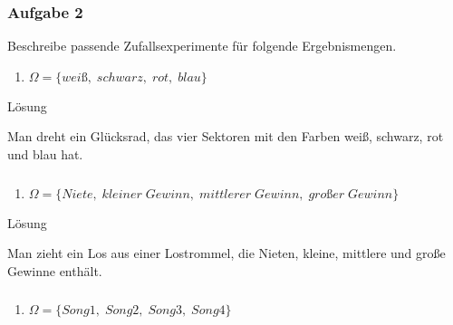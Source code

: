 \documentclass[
  ngerman,
]{book}
\providecommand{\tightlist}{%
  \setlength{\itemsep}{0pt}\setlength{\parskip}{0pt}}
\begin{document}
\hypertarget{section-45}{%
\subsubsection*{}\label{section-45}}

\hypertarget{aufgabe-2-6}{%
\subsubsection*{Aufgabe 2}\label{aufgabe-2-6}}

Beschreibe passende Zufallsexperimente für folgende Ergebnismengen.

\begin{enumerate}
\def\labelenumi{\alph{enumi})}
\tightlist
\item
  \(\Omega = \{weiß,\; schwarz,\; rot,\; blau \}\)
\end{enumerate}

Lösung

Man dreht ein Glücksrad, das vier Sektoren mit den Farben weiß, schwarz, rot und blau hat.

\hypertarget{section-46}{%
\subsubsection*{}\label{section-46}}

\begin{enumerate}
\def\labelenumi{\alph{enumi})}
\setcounter{enumi}{1}
\tightlist
\item
  \(\Omega = \{Niete,\; kleiner\;Gewinn,\; mittlerer\;Gewinn,\; großer\;Gewinn \}\)
\end{enumerate}

Lösung

Man zieht ein Los aus einer Lostrommel, die Nieten, kleine, mittlere und große Gewinne enthält.

\hypertarget{section-47}{%
\subsubsection*{}\label{section-47}}

\begin{enumerate}
\def\labelenumi{\alph{enumi})}
\setcounter{enumi}{2}
\tightlist
\item
  \(\Omega = \{Song1,\; Song2,\; Song3,\; Song4 \}\)
\end{enumerate}
\end{document}
